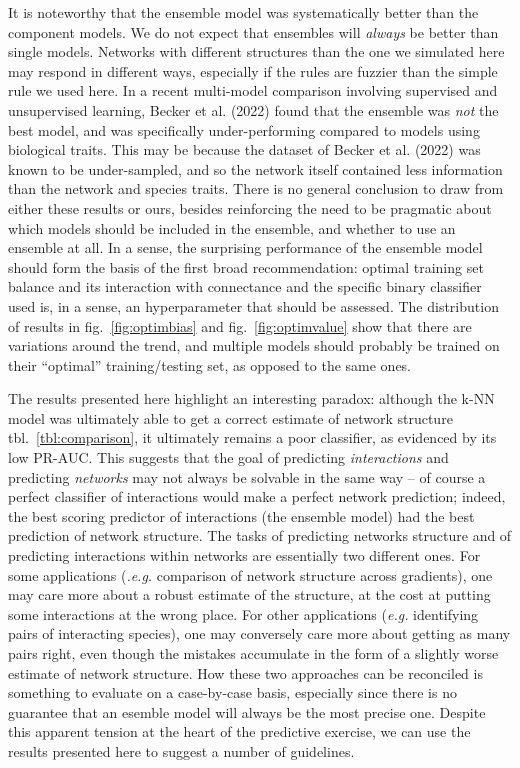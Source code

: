 \documentclass[11pt]{article}
\begin{document}
It is noteworthy that the ensemble model was systematically better than
the component models. We do not expect that ensembles will \emph{always}
be better than single models. Networks with different structures than
the one we simulated here may respond in different ways, especially if
the rules are fuzzier than the simple rule we used here. In a recent
multi-model comparison involving supervised and unsupervised learning,
Becker et al. (2022) found that the ensemble was \emph{not} the best
model, and was specifically under-performing compared to models using
biological traits. This may be because the dataset of Becker et al.
(2022) was known to be under-sampled, and so the network itself
contained less information than the network and species traits. There is
no general conclusion to draw from either these results or ours, besides
reinforcing the need to be pragmatic about which models should be
included in the ensemble, and whether to use an ensemble at all. In a
sense, the surprising performance of the ensemble model should form the
basis of the first broad recommendation: optimal training set balance
and its interaction with connectance and the specific binary classifier
used is, in a sense, an hyperparameter that should be assessed. The
distribution of results in fig.~\ref{fig:optimbias} and
fig.~\ref{fig:optimvalue} show that there are variations around the
trend, and multiple models should probably be trained on their
``optimal'' training/testing set, as opposed to the same ones.

The results presented here highlight an interesting paradox: although
the k-NN model was ultimately able to get a correct estimate of network
structure tbl.~\ref{tbl:comparison}, it ultimately remains a poor
classifier, as evidenced by its low PR-AUC. This suggests that the goal
of predicting \emph{interactions} and predicting \emph{networks} may not
always be solvable in the same way -- of course a perfect classifier of
interactions would make a perfect network prediction; indeed, the best
scoring predictor of interactions (the ensemble model) had the best
prediction of network structure. The tasks of predicting networks
structure and of predicting interactions within networks are essentially
two different ones. For some applications (\emph{.e.g.} comparison of
network structure across gradients), one may care more about a robust
estimate of the structure, at the cost at putting some interactions at
the wrong place. For other applications (\emph{e.g.} identifying pairs
of interacting species), one may conversely care more about getting as
many pairs right, even though the mistakes accumulate in the form of a
slightly worse estimate of network structure. How these two approaches
can be reconciled is something to evaluate on a case-by-case basis,
especially since there is no guarantee that an esemble model will always
be the most precise one. Despite this apparent tension at the heart of
the predictive exercise, we can use the results presented here to
suggest a number of guidelines.
\end{document}
